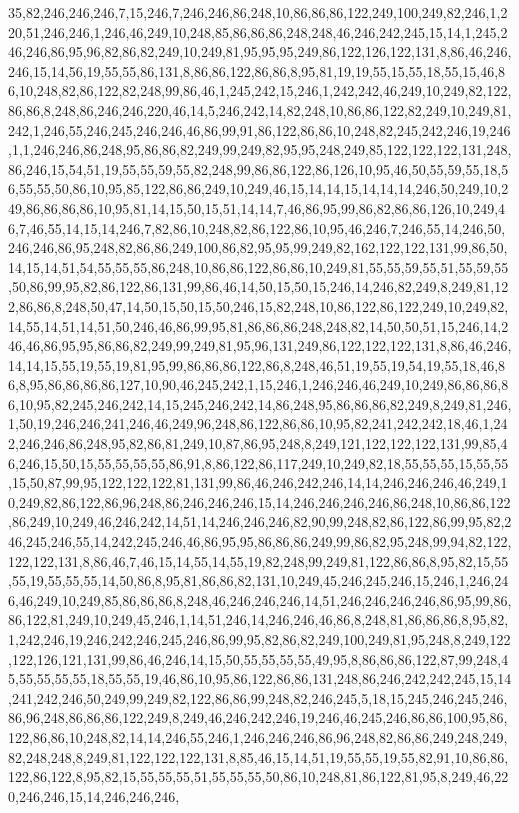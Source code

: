 35,82,246,246,246,7,15,246,7,246,246,86,248,10,86,86,86,122,249,100,249,82,246,1,220,51,246,246,1,246,46,249,10,248,85,86,86,86,248,248,46,246,242,245,15,14,1,245,246,246,86,95,96,82,86,82,249,10,249,81,95,95,95,249,86,122,126,122,131,8,86,46,246,246,15,14,56,19,55,55,86,131,8,86,86,122,86,86,8,95,81,19,19,55,15,55,18,55,15,46,86,10,248,82,86,122,82,248,99,86,46,1,245,242,15,246,1,242,242,46,249,10,249,82,122,86,86,8,248,86,246,246,220,46,14,5,246,242,14,82,248,10,86,86,122,82,249,10,249,81,242,1,246,55,246,245,246,246,46,86,99,91,86,122,86,86,10,248,82,245,242,246,19,246,1,1,246,246,86,248,95,86,86,82,249,99,249,82,95,95,248,249,85,122,122,122,131,248,86,246,15,54,51,19,55,55,59,55,82,248,99,86,86,122,86,126,10,95,46,50,55,59,55,18,56,55,55,50,86,10,95,85,122,86,86,249,10,249,46,15,14,14,15,14,14,14,246,50,249,10,249,86,86,86,86,10,95,81,14,15,50,15,51,14,14,7,46,86,95,99,86,82,86,86,126,10,249,46,7,46,55,14,15,14,246,7,82,86,10,248,82,86,122,86,10,95,46,246,7,246,55,14,246,50,246,246,86,95,248,82,86,86,249,100,86,82,95,95,99,249,82,162,122,122,131,99,86,50,14,15,14,51,54,55,55,55,86,248,10,86,86,122,86,86,10,249,81,55,55,59,55,51,55,59,55,50,86,99,95,82,86,122,86,131,99,86,46,14,50,15,50,15,246,14,246,82,249,8,249,81,122,86,86,8,248,50,47,14,50,15,50,15,50,246,15,82,248,10,86,122,86,122,249,10,249,82,14,55,14,51,14,51,50,246,46,86,99,95,81,86,86,86,248,248,82,14,50,50,51,15,246,14,246,46,86,95,95,86,86,82,249,99,249,81,95,96,131,249,86,122,122,122,131,8,86,46,246,14,14,15,55,19,55,19,81,95,99,86,86,86,122,86,8,248,46,51,19,55,19,54,19,55,18,46,86,8,95,86,86,86,86,127,10,90,46,245,242,1,15,246,1,246,246,46,249,10,249,86,86,86,86,10,95,82,245,246,242,14,15,245,246,242,14,86,248,95,86,86,86,82,249,8,249,81,246,1,50,19,246,246,241,246,46,249,96,248,86,122,86,86,10,95,82,241,242,242,18,46,1,242,246,246,86,248,95,82,86,81,249,10,87,86,95,248,8,249,121,122,122,122,131,99,85,46,246,15,50,15,55,55,55,55,86,91,8,86,122,86,117,249,10,249,82,18,55,55,55,15,55,55,15,50,87,99,95,122,122,122,81,131,99,86,46,246,242,246,14,14,246,246,246,46,249,10,249,82,86,122,86,96,248,86,246,246,246,15,14,246,246,246,246,86,248,10,86,86,122,86,249,10,249,46,246,242,14,51,14,246,246,246,82,90,99,248,82,86,122,86,99,95,82,246,245,246,55,14,242,245,246,46,86,95,95,86,86,86,249,99,86,82,95,248,99,94,82,122,122,122,131,8,86,46,7,46,15,14,55,14,55,19,82,248,99,249,81,122,86,86,8,95,82,15,55,55,19,55,55,55,14,50,86,8,95,81,86,86,82,131,10,249,45,246,245,246,15,246,1,246,246,46,249,10,249,85,86,86,86,8,248,46,246,246,246,14,51,246,246,246,246,86,95,99,86,86,122,81,249,10,249,45,246,1,14,51,246,14,246,246,46,86,8,248,81,86,86,86,8,95,82,1,242,246,19,246,242,246,245,246,86,99,95,82,86,82,249,100,249,81,95,248,8,249,122,122,126,121,131,99,86,46,246,14,15,50,55,55,55,55,49,95,8,86,86,86,122,87,99,248,45,55,55,55,55,18,55,55,19,46,86,10,95,86,122,86,86,131,248,86,246,242,242,245,15,14,241,242,246,50,249,99,249,82,122,86,86,99,248,82,246,245,5,18,15,245,246,245,246,86,96,248,86,86,86,122,249,8,249,46,246,242,246,19,246,46,245,246,86,86,100,95,86,122,86,86,10,248,82,14,14,246,55,246,1,246,246,246,86,96,248,82,86,86,249,248,249,82,248,248,8,249,81,122,122,122,131,8,85,46,15,14,51,19,55,55,19,55,82,91,10,86,86,122,86,122,8,95,82,15,55,55,55,51,55,55,55,50,86,10,248,81,86,122,81,95,8,249,46,220,246,246,15,14,246,246,246,